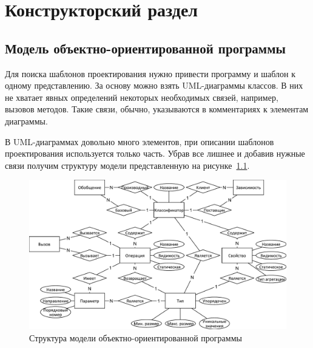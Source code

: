 \chapter{Конструкторский раздел}
\label{cha:design}

\section{Модель объектно-ориентированной программы}

Для поиска шаблонов проектирования нужно привести программу и шаблон к одному представлению.
За основу можно взять UML-диаграммы классов.
В них не хватает явных определений некоторых необходимых связей, например, вызовов методов.
Такие связи, обычно, указываются в комментариях к элементам диаграммы.

В UML-диаграммах довольно много элементов, при описании шаблонов проектирования используется только часть.
Убрав все лишнее и добавив нужные связи получим структуру модели представленную на рисунке~\ref{fig:model}.

\begin{figure}
\centering
\includegraphics[width=\textwidth]{inc/model.pdf}
\caption{Структура модели объектно-ориентированной программы}
\label{fig:model}
\end{figure}

